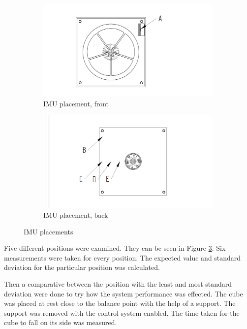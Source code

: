 \documentclass[a4paper,11pt]{kth-mag}
\begin{document}
\begin{figure}
\centering
\begin{subfigure}{.48\textwidth}
  \centering
  \includegraphics[trim=0.3cm 0.1cm 0.8cm 0.2cm, clip=true, width=\textwidth]{framsidaIMUpunkter.jpg}
  \caption{IMU placement, front}
  \label{Fig: IMU placement front}
\end{subfigure}
\begin{subfigure}{.48\textwidth}
  \centering
  \includegraphics[trim=0.6cm 0.15cm 0.5cm 0.2cm, clip=true, width=\textwidth]{baksidaIMUpunkter.jpg}
  \caption{IMU placement, back}
  \label{Fig: IMU placement back}
\end{subfigure}
\caption{IMU placements}
\label{Fig: IMU placement}
\end{figure}

Five different positions were examined. They can be seen in Figure \ref{Fig: IMU placement}. Six measurements were taken for every position. The expected value and standard deviation for the particular position was calculated.

Then a comparative between the position with the least and most standard deviation were done
to try how the system performance was effected. The cube was placed at rest close to the balance point with the help of a support. The support was removed with the control system enabled. The time taken for the cube to fall on its side was measured.
\end{document}
